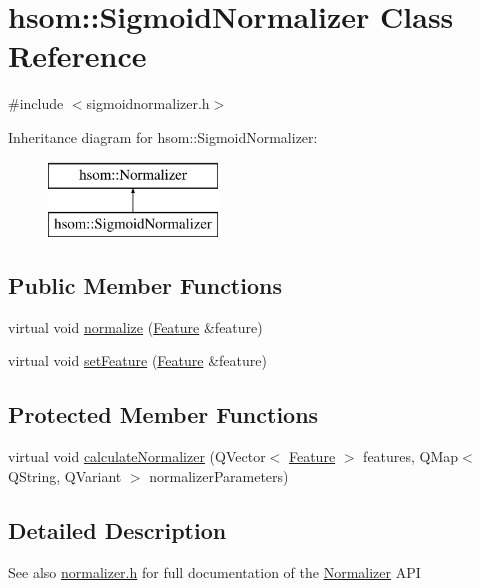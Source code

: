 \hypertarget{classhsom_1_1_sigmoid_normalizer}{\section{hsom\-:\-:\-Sigmoid\-Normalizer \-Class \-Reference}
\label{classhsom_1_1_sigmoid_normalizer}
}


{\ttfamily \#include $<$sigmoidnormalizer.\-h$>$}

\-Inheritance diagram for hsom\-:\-:\-Sigmoid\-Normalizer\-:\begin{figure}[H]
\begin{center}
\leavevmode
\includegraphics[height=2.000000cm]{classhsom_1_1_sigmoid_normalizer}
\end{center}
\end{figure}
\subsection*{\-Public \-Member \-Functions}
\begin{DoxyCompactItemize}
\item 
virtual void \hyperlink{classhsom_1_1_sigmoid_normalizer_a16256f0977a0bb6983e4e46edf00067b}{normalize} (\hyperlink{classhsom_1_1_feature}{\-Feature} \&feature)
\item 
virtual void \hyperlink{classhsom_1_1_sigmoid_normalizer_af31b9bcbcfefd2c98881a92116c0ba2c}{set\-Feature} (\hyperlink{classhsom_1_1_feature}{\-Feature} \&feature)
\end{DoxyCompactItemize}
\subsection*{\-Protected \-Member \-Functions}
\begin{DoxyCompactItemize}
\item 
virtual void \hyperlink{classhsom_1_1_sigmoid_normalizer_a96240b51c8c107cbb1183b6f61cd5a8a}{calculate\-Normalizer} (\-Q\-Vector$<$ \hyperlink{classhsom_1_1_feature}{\-Feature} $>$ features, \-Q\-Map$<$ \-Q\-String, \-Q\-Variant $>$ normalizer\-Parameters)
\end{DoxyCompactItemize}


\subsection{\-Detailed \-Description}
\begin{DoxySeeAlso}{\-See also}
\hyperlink{normalizer_8h_source}{normalizer.\-h} for full documentation of the \hyperlink{classhsom_1_1_normalizer}{\-Normalizer} \-A\-P\-I 
\end{DoxySeeAlso}


